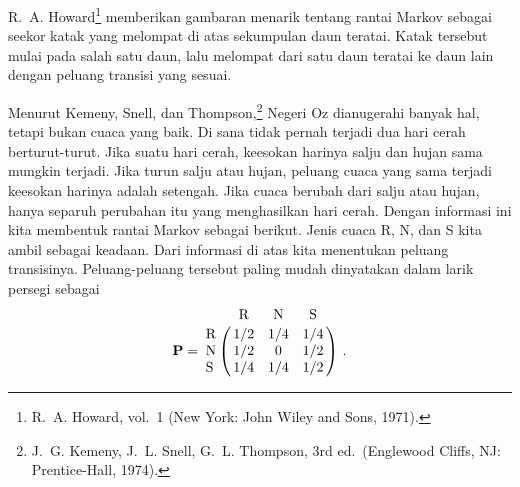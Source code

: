 R.~A. Howard\footnote{R.~A. Howard, 
vol.~1
(New York: John Wiley and Sons, 1971).} memberikan
gambaran menarik tentang rantai Markov sebagai seekor katak yang melompat di
atas sekumpulan daun teratai. Katak tersebut mulai pada salah satu daun, lalu
melompat dari satu daun teratai ke daun lain dengan peluang transisi yang sesuai.



\begin{example}\label{exam 11.1.1}
Menurut Kemeny, Snell, dan Thompson,\footnote{J.~G. Kemeny, J.~L. Snell,
G.~L. Thompson,  3rd ed.\ (Englewood
Cliffs, NJ: Prentice-Hall, 1974).} Negeri Oz dianugerahi banyak hal,
tetapi bukan cuaca yang baik. Di sana tidak pernah terjadi dua hari cerah
berturut-turut. Jika suatu hari cerah, keesokan harinya salju dan hujan sama
mungkin terjadi. Jika turun salju atau hujan, peluang cuaca yang sama terjadi
keesokan harinya adalah setengah. Jika cuaca berubah dari salju atau hujan,
hanya separuh perubahan itu yang menghasilkan hari cerah. Dengan informasi ini
kita membentuk rantai Markov sebagai berikut. Jenis cuaca R, N, dan S kita ambil
sebagai keadaan. Dari informasi di atas kita menentukan peluang transisinya.
Peluang-peluang tersebut paling mudah dinyatakan dalam larik persegi sebagai
$$
\mat {P} = \bordermatrix{
        & \mbox {R} & \mbox {N} & \mbox {S} \cr
\mbox {R} &     1/2 &     1/4 &     1/4 \cr
\mbox {N} &     1/2 &       0 &     1/2 \cr
\mbox {S} &     1/4 &     1/4 &     1/2}\ .
$$
\end{example}

